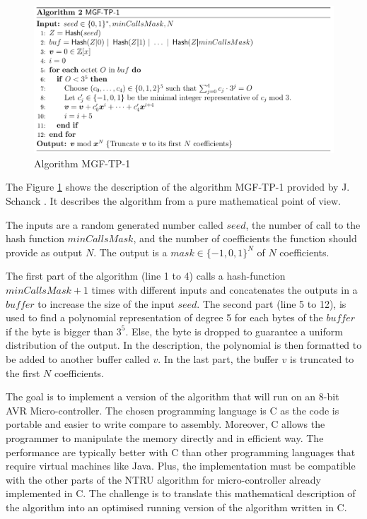 \begin{figure}[h]
  \includegraphics[width=\textwidth]{img/mgf1-description.png}
  \caption{Algorithm MGF-TP-1 \cite{schanck_practical_2015} }
  \label{fig:mgf-1}
\end{figure}

The Figure \ref{fig:mgf-1} shows the description of the algorithm MGF-TP-1 provided by J. Schanck \cite{schanck_practical_2015}. It describes the algorithm from a pure mathematical point of view. 

The inputs are a random generated number called $seed$, the number of call to the hash function $minCallsMask$, and the number of coefficients the function should provide as output $N$. The output is a $mask \in \{-1,0,1\}^N$ of $N$ coefficients.

The first part of the algorithm (line 1 to 4) calls a hash-function  $minCallsMask + 1$ times with different inputs and concatenates the outputs in a $buffer$ to increase the size of the input $seed$.
The second part (line 5 to 12), is used to find a polynomial representation of degree 5 for each bytes of the $buffer$ if the byte is bigger than $3^5$. Else, the byte is dropped to guarantee a uniform distribution of the output. In the description, the polynomial is then formatted to be added to another buffer called $v$.
In the last part, the buffer $v$ is truncated to the first $N$ coefficients.

The goal is to implement a version of the algorithm that will run on an 8-bit AVR Micro-controller. The chosen programming language is C as the code is portable and easier to write compare to assembly. Moreover, C allows the programmer to manipulate the memory directly and in efficient way. The performance are typically better with C than other programming languages that require virtual machines like Java. Plus, the implementation must be compatible with the other parts of the NTRU algorithm for micro-controller already implemented in C.
The challenge is to translate this mathematical description of the algorithm into an optimised running version of the algorithm written in C.


